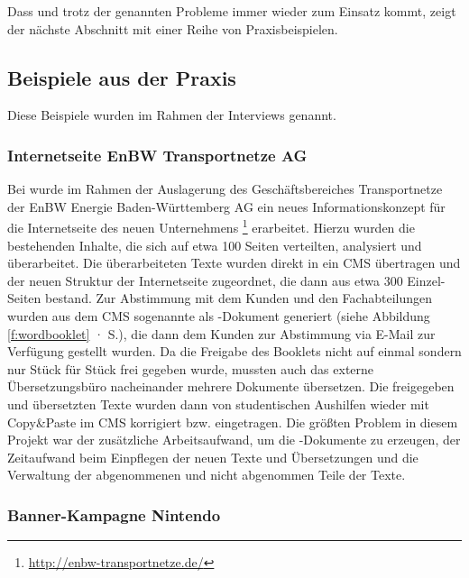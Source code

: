 \secbar

Dass  und  trotz der genannten Probleme immer wieder zum Einsatz kommt, zeigt der nächste Abschnitt mit einer Reihe von Praxisbeispielen.

\subsection{Beispiele aus der Praxis}\label{l:praxisbeispiele}

Diese Beispiele wurden im Rahmen der Interviews genannt.

\subsubsection{Internetseite EnBW Transportnetze AG}

Bei  wurde im Rahmen der Auslagerung des Geschäftsbereiches Transportnetze der EnBW Energie Baden-Württemberg AG ein neues Informationskonzept für die Internetseite des neuen Unternehmens \footnote{\url{http://enbw-transportnetze.de/}} erarbeitet. Hierzu wurden die bestehenden Inhalte, die sich auf etwa 100 Seiten verteilten, analysiert und überarbeitet. Die überarbeiteten Texte wurden direkt in ein CMS übertragen und der neuen Struktur der Internetseite zugeordnet, die dann aus etwa 300 Einzel-Seiten bestand. Zur Abstimmung mit dem Kunden und den Fachabteilungen wurden aus dem CMS sogenannte  als -Dokument generiert (siehe Abbildung \ref{f:wordbooklet} · S.\pageref{f:wordbooklet}), die dann dem Kunden zur Abstimmung via E-Mail zur Verfügung gestellt wurden. Da die Freigabe des Booklets nicht auf einmal sondern nur Stück für Stück frei gegeben wurde, mussten auch das externe Übersetzungsbüro nacheinander mehrere Dokumente übersetzen. Die freigegeben und übersetzten Texte wurden dann von studentischen Aushilfen wieder mit Copy\&Paste im CMS korrigiert bzw. eingetragen. Die größten Problem in diesem Projekt war der zusätzliche Arbeitsaufwand, um die -Dokumente zu erzeugen, der Zeitaufwand beim Einpflegen der neuen Texte und Übersetzungen und die Verwaltung der abgenommenen und nicht abgenommen Teile der Texte.

\subsubsection{Banner-Kampagne Nintendo}

